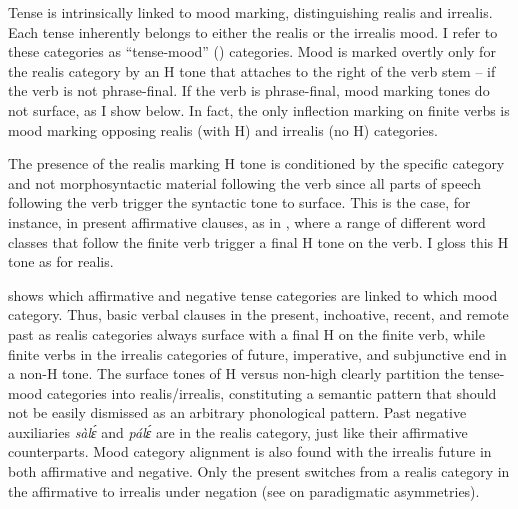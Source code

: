 \documentclass[output=paper,colorlinks=true, citecolor=brown,draftmode]{langscibook}
\begin{document}
Tense is intrinsically linked to mood marking, distinguishing realis and irrealis. Each tense inherently belongs to either the realis or the irrealis mood.  I refer to these categories as ``tense-mood'' ({\TM}) categories. Mood is marked overtly only for the realis category by an H tone that attaches to the right of the verb stem -- if the verb is not phrase-final. If the verb is phrase-final, mood marking tones do not surface, as I show below.  In fact, the only inflection marking on finite verbs is mood marking opposing realis (with H) and irrealis (no H) categories. 

The presence of the realis marking H tone is conditioned by the specific {\TM} category and not morphosyntactic material following the verb since all parts of speech following the verb trigger the syntactic tone to surface.
This is the case, for instance, in present affirmative clauses, as in , where a range of different word classes that follow the finite verb trigger a final H tone on the verb. I gloss this H tone as {\R} for realis. 

 shows which affirmative and negative tense categories are  linked to which mood category. Thus, basic verbal clauses in the present, inchoative, recent, and remote past as realis categories always surface with a final H on the finite verb, while finite verbs in the irrealis categories of future, imperative, and subjunctive end in a non-H tone. The surface tones of H versus non-high clearly partition the tense-mood categories into realis/irrealis, constituting a semantic pattern that should not be easily dismissed as an arbitrary phonological pattern. Past negative auxiliaries {\itshape sàlɛ́} and {\itshape pálɛ́} are in the realis category, just like their affirmative counterparts. Mood category alignment is also found with the irrealis future in both affirmative and negative. Only the present switches from a realis category in the affirmative to irrealis under negation (see  on paradigmatic asymmetries). 
\end{document}
